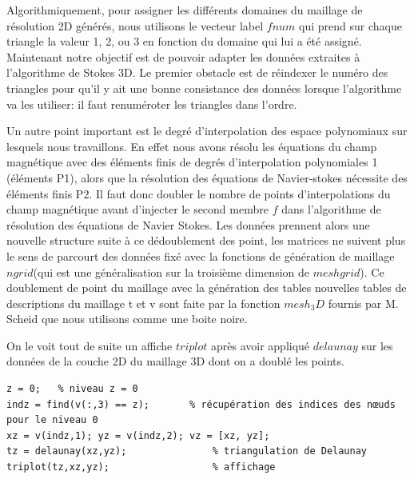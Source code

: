 \documentclass[a4paper,12pt,titlepage]{report}
\begin{document}
\begin{onehalfspace}
\newpage
Algorithmiquement, pour assigner les différents domaines du maillage de résolution 2D générés, nous utilisons le vecteur label $fnum$ qui prend sur chaque triangle la valeur 1, 2, ou 3 en fonction du domaine qui lui a été assigné.
\newline
Maintenant  notre objectif est de pouvoir adapter les données extraites à l'algorithme de Stokes 3D. Le premier obstacle est de réindexer le numéro des triangles pour qu'il y ait une bonne consistance des données lorsque l'algorithme va les utiliser: il faut renuméroter les triangles dans l'ordre. 
\newline  	

Un autre point important est le degré d'interpolation des espace polynomiaux sur lesquels nous travaillons. En effet nous avons résolu les équations du champ magnétique avec des éléments finis de degrés d'interpolation polynomiales 1 (éléments P1), alors que la résolution des équations de Navier-stokes nécessite des éléments finis P2. Il faut donc doubler le nombre de points d'interpolations du champ magnétique avant d'injecter le second membre $f$ dans l'algorithme de résolution des équations de Navier Stokes. Les données prennent alors une nouvelle structure suite à ce dédoublement des point, les matrices ne suivent plus le sens de parcourt des données fixé avec la fonctions de génération de maillage $ngrid$(qui est une généralisation sur la troisième dimension  de $meshgrid$). Ce doublement de point du maillage avec la génération des tables nouvelles tables de descriptions du maillage t et v sont faite par la fonction $mesh_3D$ fournis par M. Scheid que nous utilisons comme une boite noire.

On le voit tout de suite un affiche $triplot$ après avoir appliqué $delaunay$ sur les données de la couche 2D du maillage 3D dont on a doublé les points.
\begin{verbatim}
z = 0;   % niveau z = 0
indz = find(v(:,3) == z);		% récupération des indices des nœuds pour le niveau 0
xz = v(indz,1); yz = v(indz,2); vz = [xz, yz];
tz = delaunay(xz,yz);               % triangulation de Delaunay 
triplot(tz,xz,yz);   				% affichage
\end{verbatim}


\end{onehalfspace}
\end{document}
